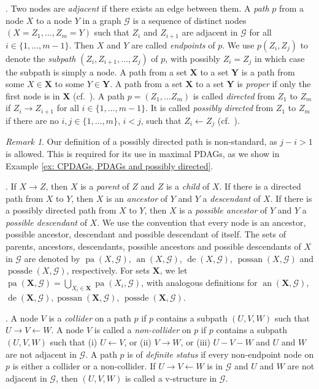 \documentclass[11pt,a4paper]{article}
\theoremstyle{definition}
\theoremstyle{remark}
\newtheorem{Remark}[Satz]{Remark}
\DeclareMathOperator{\pa}{pa}
\DeclareMathOperator{\de}{de}
\DeclareMathOperator{\possde}{possde}
\DeclareMathOperator{\an}{an}
\DeclareMathOperator{\possan}{possan}
\newcommand{\mpdag}{maximal PDAG}
\newcommand{\g}[1][G]{\mathcal{#1}}
\newcommand{\vsp}{\vspace{.2cm}}
\begin{document}
\vsp {}. 
Two nodes are \emph{adjacent} if there exists an edge between them.
A \textit{path} $p$ from a node $X$ to a node $Y$ in a graph $\g$ is a sequence of distinct nodes $(X = Z_1, \dots, Z_m=Y)$ such that 
$Z_i$ and $Z_{i+1}$ are adjacent in $\g$ for all $i \in \{1, \dots, m-1\}$. Then $X$ and $Y$ are called \emph{endpoints} of $p$. We use $p(Z_i, Z_j)$ to denote the \textit{subpath} $(Z_i, Z_{i+1}, \dots, Z_j)$ of $p$, with possibly $Z_i =Z_j$ in which case the subpath is simply a node. A path from a set $\mathbf{X}$ to a set $\mathbf{Y}$ is a path from some $X \in \mathbf{X}$ to some $Y \in \mathbf{Y}$. A path from a set $\mathbf{X}$ to a set $\mathbf{Y}$ is \textit{proper} if only the first node is in $\mathbf{X}$ (cf.\ \citet{shpitser2010validity}). 
A path $p = (Z_1, \dots Z_m)$ is called \emph{directed} from $Z_1$ to  $Z_m$ if $Z_i \rightarrow Z_{i+1}$ for all $ i \in \{1,\dots,m-1\}$. It is called \emph{possibly directed} from $Z_1$ to $Z_m$ if there are no $i, j \in \{1,\dots,m\}$, $i <j$, such that $Z_{i} \leftarrow Z_{j}$ (cf.\ \citet{perkovic17}).


\begin{Remark}
	Our definition of a possibly directed path is non-standard, as $j-i>1$ is allowed. This is required for its use in \mpdag{}s, as we show in Example \ref{ex: CPDAGs, PDAGs and possibly directed}. 
\end{Remark}



.  If $X \to Z$, then $X$ is a \textit{parent} of $Z$ and $Z$ is a \textit{child} of $X$. 
If there is a  directed path from $X$ to $Y$, then $X$ is an \textit{ancestor} of $Y$ and $Y$ a  \textit{descendant} of $X$. If there is a  possibly directed path from $X$ to $Y$, then $X$ is a \textit{possible ancestor} of $Y$ and $Y$ a  \textit{possible descendant} of $X$. 
We use the convention that every node is an ancestor, possible ancestor, descendant and possible descendant of itself. 
The sets of parents, ancestors, descendants, possible ancestors  and possible descendants of $X$ in $\g$ are denoted by $\pa(X,\g)$, $\an(X,\g)$, $\de(X,\g)$, $\possan(X,\g)$ and $\possde(X,\g)$, respectively. 
For sets $\mathbf{X}$, we let $\pa(\mathbf{X},\g)=\bigcup_{X_i \in \mathbf{X}} \pa(X_i,\g)$, with analogous definitions for $\an(\mathbf{X},\g)$, $\de(\mathbf{X},\g),\possan(\mathbf{X},\g)$, $\possde(\mathbf{X},\g)$.


\vsp{}. A node $V$ is a  \emph{collider} on a path $p$ if $p$ contains a subpath $(U,V,W)$ such that $U \rightarrow V \leftarrow W$. A node $V$ is called a \emph{non-collider} on $p$ if $p$ contains a subpath $(U,V,W)$ such that 
(i) $U \leftarrow V$, or (ii) $V\to W$, or (iii) $U-V-W$ and $U$ and $W$ are not adjacent in $\g$.
A path $p$ is of \textit{definite status} if every non-endpoint node on $p$ is either a collider or a non-collider. 
If $U \rightarrow V \leftarrow W$ is in $\g$ and $U$ and $W$ are not adjacent in $\g$, then $(U,V,W)$ is called a v-structure in $\g$. 
\end{document}
